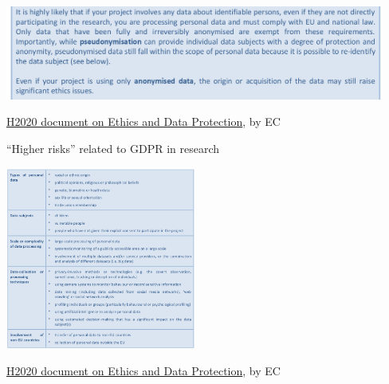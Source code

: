 \documentclass[17pt,aspectratio=169,hyperref={pdfusetitle,colorlinks,allcolors=olive}]{beamer}
\begin{document}
\begin{frame}[fragile]

  \begin{center}
  \includegraphics[width=12.5cm]{figs/gdpr-anon-pseudoanon}
  \end{center}
  
  {\footnotesize
    \begin{flushright}
    \href{https://ec.europa.eu/research/participants/data/ref/h2020/grants_manual/hi/ethics/h2020_hi_ethics-data-protection_en.pdf}{H2020 document on Ethics and Data Protection},  by EC
  \end{flushright}
  }
  
\end{frame}

\begin{frame}[fragile]

  ``Higher risks'' related to GDPR in research
  
  \begin{center}
  \includegraphics[height=6cm]{figs/gdpr-higher-risks}
  \end{center}
  
  {\footnotesize
    \begin{flushright}
    \href{https://ec.europa.eu/research/participants/data/ref/h2020/grants_manual/hi/ethics/h2020_hi_ethics-data-protection_en.pdf}{H2020 document on Ethics and Data Protection},  by EC
  \end{flushright}
  }
  
\end{frame}
\end{document}
